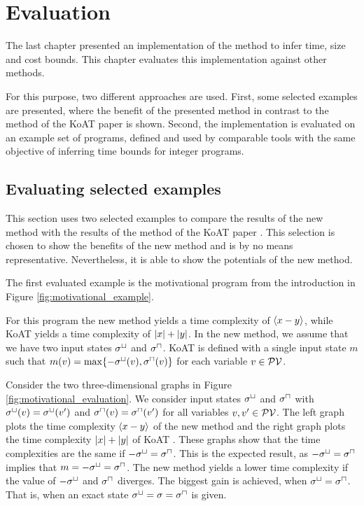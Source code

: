 \section{Evaluation}

The last chapter presented an implementation of the method to infer time, size and cost bounds.
This chapter evaluates this implementation against other methods.

For this purpose, two different approaches are used.
First, some selected examples are presented, where the benefit of the presented method in contrast to the method of the KoAT paper \cite{koat} is shown.
Second, the implementation is evaluated on an example set of programs, defined and used by comparable tools with the same objective of inferring time bounds for integer programs.

\subsection{Evaluating selected examples}

This section uses two selected examples to compare the results of the new method with the results of the method of the KoAT paper \cite{koat}.
This selection is chosen to show the benefits of the new method and is by no means representative.
Nevertheless, it is able to show the potentials of the new method.

The first evaluated example is the motivational program from the introduction in Figure \ref{fig:motivational_example}.



For this program the new method yields a time complexity of $\langle x-y\rangle$, while KoAT \cite{koat} yields a time complexity of $\left|x\right|+\left|y\right|$.
In the new method, we assume that we have two input states ${\sigma^\sqcup}$ and ${\sigma^\sqcap}$.
KoAT \cite{koat} is defined with a single input state $m$ such that $m(v) = \max \lbrace -{\sigma^\sqcup}(v),{\sigma^\sqcap}(v) \rbrace$ for each variable $v \in \mathcal{PV}$.

Consider the two three-dimensional graphs in Figure \ref{fig:motivational_evaluation}.
We consider input states ${\sigma^\sqcup}$ and ${\sigma^\sqcap}$ with ${\sigma^\sqcup}(v) = {\sigma^\sqcup}(v')$ and ${\sigma^\sqcap}(v) = {\sigma^\sqcap}(v')$ for all variables $v, v' \in \mathcal{PV}$.
The left graph plots the time complexity $\langle x-y\rangle$ of the new method and the right graph plots the time complexity $\left|x\right|+\left|y\right|$ of KoAT \cite{koat}.
These graphs show that the time complexities are the same if $-{\sigma^\sqcup} = {\sigma^\sqcap}$.
This is the expected result, as $-{\sigma^\sqcup} = {\sigma^\sqcap}$ implies that $m = -{\sigma^\sqcup} = {\sigma^\sqcap}$.
The new method yields a lower time complexity if the value of $-{\sigma^\sqcup}$ and ${\sigma^\sqcap}$ diverges.
The biggest gain is achieved, when ${\sigma^\sqcup} = {\sigma^\sqcap}$.
That is, when an exact state ${\sigma^\sqcup} = \sigma = {\sigma^\sqcap}$ is given.


